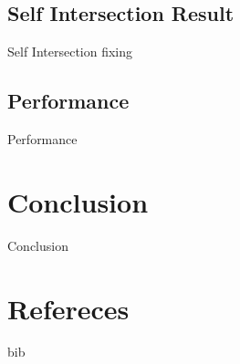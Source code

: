 \documentclass[10pt]{beamer}
\begin{document}
\subsection{Self Intersection Result}
\begin{frame}{Self Intersection fixing}
    
\end{frame}

\subsection{Performance}
\begin{frame}{Performance}
    
\end{frame}

\section{Conclusion}
\begin{frame}{Conclusion}
    
\end{frame}

\section{Refereces}
\begin{frame}{bib}
    
\end{frame}
\end{document}
